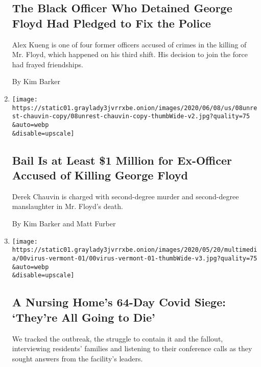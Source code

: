 \begin{enumerate}
  \hypertarget{the-black-officer-who-detained-george-floyd-had-pledged-to-fix-the-police}{%
  \subsection{The Black Officer Who Detained George Floyd Had Pledged to
  Fix the
  Police}\label{the-black-officer-who-detained-george-floyd-had-pledged-to-fix-the-police}}

  Alex Kueng is one of four former officers accused of crimes in the
  killing of Mr. Floyd, which happened on his third shift. His decision
  to join the force had frayed friendships.

  By Kim Barker
\item
  \href{/2020/06/08/us/derek-chauvin-court.html}{}

  \texttt{[image: https://static01.graylady3jvrrxbe.onion/images/2020/06/08/us/08unrest-chauvin-copy/08unrest-chauvin-copy-thumbWide-v2.jpg?quality=75\\\&auto=webp\\\&disable=upscale]}

  \hypertarget{bail-is-at-least-1-million-for-ex-officer-accused-of-killing-george-floyd}{%
  \subsection{Bail Is at Least \$1 Million for Ex-Officer Accused of
  Killing George
  Floyd}\label{bail-is-at-least-1-million-for-ex-officer-accused-of-killing-george-floyd}}

  Derek Chauvin is charged with second-degree murder and second-degree
  manslaughter in Mr. Floyd's death.

  By Kim Barker and Matt Furber
\item
  \href{/2020/06/08/us/coronavirus-nursing-home-vermont-deaths.html}{}

  \texttt{[image: https://static01.graylady3jvrrxbe.onion/images/2020/05/20/multimedia/00virus-vermont-01/00virus-vermont-01-thumbWide-v3.jpg?quality=75\\\&auto=webp\\\&disable=upscale]}

  \hypertarget{a-nursing-homes-64-day-covid-siege-theyre-all-going-to-die}{%
  \subsection{A Nursing Home's 64-Day Covid Siege: `They're All Going to
  Die'}\label{a-nursing-homes-64-day-covid-siege-theyre-all-going-to-die}}

  We tracked the outbreak, the struggle to contain it and the fallout,
  interviewing residents' families and listening to their conference
  calls as they sought answers from the facility's leaders.


\end{enumerate}
